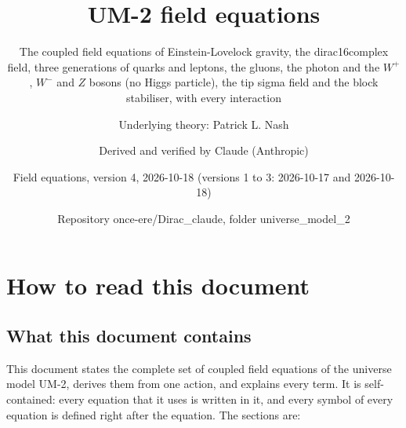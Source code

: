 \documentclass[
  10pt,
]{article}
\title{UM-2 field equations}
\subtitle{The coupled field equations of Einstein-Lovelock gravity, the
dirac16complex field, three generations of quarks and leptons, the
gluons, the photon and the \(W^+\), \(W^-\) and \(Z\) bosons (no Higgs
particle), the tip sigma field and the block stabiliser, with every
interaction}
\author{Underlying theory: Patrick L. Nash \and Derived and verified by
Claude (Anthropic) \and Field equations, version 4, 2026-10-18 (versions
1 to 3: 2026-10-17 and 2026-10-18) \and Repository
once-ere/Dirac\_claude, folder universe\_model\_2}
\date{}
\begin{document}
\maketitle

{
\hypersetup{linkcolor=}
\setcounter{tocdepth}{3}
\tableofcontents
}
\hypertarget{how-to-read-this-document}{%
\section{How to read this document}\label{how-to-read-this-document}}

\hypertarget{what-this-document-contains}{%
\subsection{What this document
contains}\label{what-this-document-contains}}

This document states the complete set of coupled field equations of the
universe model UM-2, derives them from one action, and explains every
term. It is self-contained: every equation that it uses is written in
it, and every symbol of every equation is defined right after the
equation. The sections are:
\end{document}
